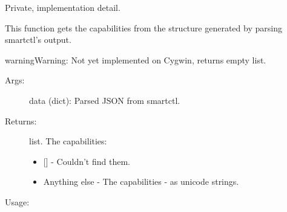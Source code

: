 \documentclass[letterpaper,10pt,english]{sphinxmanual}
\begin{document}
\begin{fulllineitems}
\label{\detokenize{cygwin:getdevinfo.cygwin.get_capabilities}}
Private, implementation detail.

This function gets the capabilities from the structure generated
by parsing smartctl’s output.

\begin{sphinxadmonition}{warning}{Warning:}
Not yet implemented on Cygwin, returns empty list.
\end{sphinxadmonition}
\begin{description}
\item[{Args:}] \leavevmode
data (dict):   Parsed JSON from smartctl.

\item[{Returns:}] \leavevmode
list. The capabilities:
\begin{itemize}
\item {} 
{[}{]}            - Couldn’t find them.

\item {} 
Anything else - The capabilities - as unicode strings.

\end{itemize}

\end{description}

Usage:

\begin{sphinxVerbatim}[commandchars=\\\{\}]
  
\end{sphinxVerbatim}

\end{fulllineitems}

\end{document}
